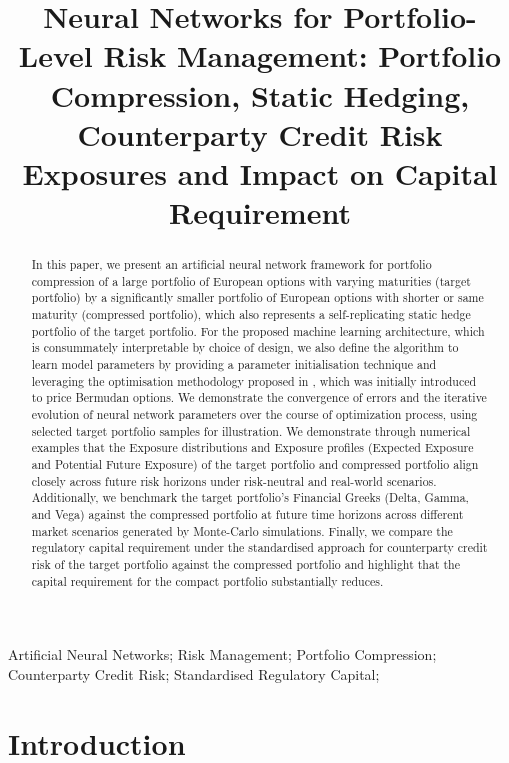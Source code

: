 
\title{Neural Networks for Portfolio-Level Risk Management: Portfolio Compression, Static Hedging, Counterparty Credit Risk Exposures and Impact on Capital Requirement}
\maketitle

\begin{abstract}
In this paper, we present an artificial neural network framework for portfolio compression of a large portfolio of European options with varying maturities (target portfolio) by a significantly smaller portfolio of European options with shorter or same maturity (compressed portfolio), which also represents a self-replicating static hedge portfolio of the target portfolio. For the proposed machine learning architecture, which is consummately interpretable by choice of design, we also define the algorithm to learn model parameters by providing a parameter initialisation technique and leveraging the optimisation methodology proposed in \cite{dhandapani2024bermudan}, which was initially introduced to price Bermudan options. We demonstrate the convergence of errors and the iterative evolution of neural network parameters over the course of optimization process, using selected target portfolio samples for illustration. We demonstrate through numerical examples that the Exposure distributions and Exposure profiles (Expected Exposure and Potential Future Exposure) of the target portfolio and compressed portfolio align closely across future risk horizons under risk-neutral and real-world scenarios. Additionally, we benchmark the target portfolio's Financial Greeks (Delta, Gamma, and Vega) against the compressed portfolio at future time horizons across different market scenarios generated by Monte-Carlo simulations. Finally, we compare the regulatory capital requirement under the standardised approach for counterparty credit risk of the target portfolio against the compressed portfolio and highlight that the capital requirement for the compact portfolio substantially reduces. 
\end{abstract}



\begin{keywords}
Artificial Neural Networks; Risk Management; Portfolio Compression; Counterparty Credit Risk; Standardised Regulatory Capital; 
\end{keywords}


\section{Introduction}


